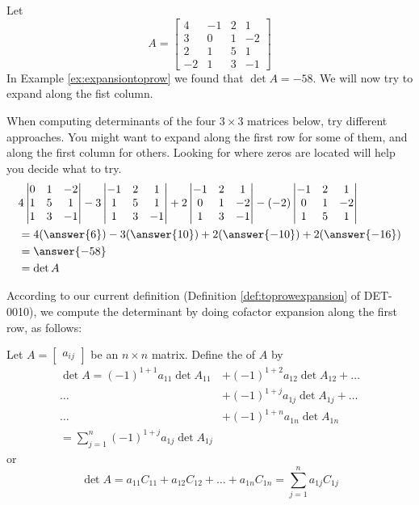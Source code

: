 \documentclass{ximera}
\begin{document}
\begin{exploration}\label{init:expansionfirstcol2}
Let
$$A=\begin{bmatrix}4&-1&2&1\\3&0&1&-2\\
2&1&5&1\\-2&1&3&-1\end{bmatrix}$$
In Example \ref{ex:expansiontoprow} we found that $\det{A}=-58$.  We will now try to expand along the fist column.  

When computing determinants of the four $3\times 3$ matrices below, try different approaches.  You might want to expand along the first row for some of them, and along the first column for others.  Looking for where zeros are located will help you decide what to try.
\begin{align*}
&4\begin{vmatrix}0&1&-2\\1&5&1\\1&3&-1\end{vmatrix}-3\begin{vmatrix}-1&2&1\\1&5&1\\1&3&-1\end{vmatrix}+2\begin{vmatrix}-1&2&1\\0&1&-2\\1&3&-1\end{vmatrix}-(-2)\begin{vmatrix}-1&2&1\\0&1&-2\\1&5&1\end{vmatrix}\\
&=4(\answer{6})-3(\answer{10})+2(\answer{-10})+2(\answer{-16})\\
&=\answer{-58}\\
&=\det{A}
\end{align*}

\end{exploration}

According to our current definition (Definition \ref{def:toprowexpansion} of DET-0010), we compute the determinant by doing cofactor expansion along the first row, as follows:

  Let $A=\begin{bmatrix}a_{ij}\end{bmatrix}$ be an $n\times n$ matrix.  Define the  of $A$ by
\begin{align*}\det{A}=(-1)^{1+1}a_{11}\det{A_{11}}&+(-1)^{1+2}a_{12}\det{A_{12}}+\ldots \\
\ldots &+(-1)^{1+j}a_{1j}\det{A_{1j}}+\ldots \\
\ldots &+(-1)^{1+n}a_{1n}\det{A_{1n}}\\
=\sum_{j=1}^n(-1)^{1+j}a_{1j}\det{A_{1j}}
\end{align*}
or
$$\det{A}=a_{11}C_{11}+a_{12}C_{12}+\ldots +a_{1n}C_{1n}=\sum_{j=1}^n a_{1j}C_{1j}$$
\end{document}
